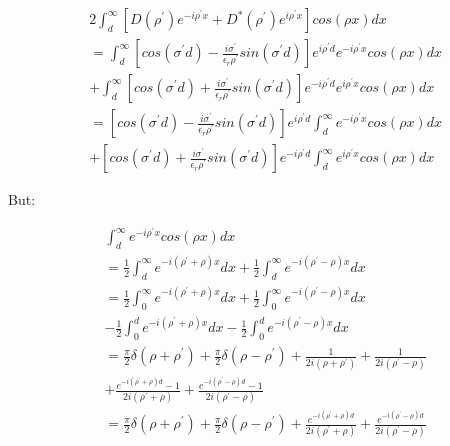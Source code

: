 \documentclass[11pt, oneside]{article}   	%
\begin{document}
\begin{align*}
 & 2\int_{d}^{\infty}\left[D\left(\rho^{\prime}\right)e^{-i\rho^{\prime}x}+D^{*}\left(\rho^{\prime}\right)e^{i\rho^{\prime}x}\right]cos\left(\rho x\right)dx\\
 & =\int_{d}^{\infty}\left[cos\left(\sigma^{\prime}d\right)-\frac{i\sigma^{\prime}}{\epsilon_{r}\rho^{\prime}}sin\left(\sigma^{\prime}d\right)\right]e^{i\rho^{\prime}d}e^{-i\rho^{\prime}x}cos\left(\rho x\right)dx\\
 & +\int_{d}^{\infty}\left[cos\left(\sigma^{\prime}d\right)+\frac{i\sigma^{\prime}}{\epsilon_{r}\rho^{\prime}}sin\left(\sigma^{\prime}d\right)\right]e^{-i\rho^{\prime}d}e^{i\rho^{\prime}x}cos\left(\rho x\right)dx\\
 & =\left[cos\left(\sigma^{\prime}d\right)-\frac{i\sigma^{\prime}}{\epsilon_{r}\rho^{\prime}}sin\left(\sigma^{\prime}d\right)\right]e^{i\rho^{\prime}d}\int_{d}^{\infty}e^{-i\rho^{\prime}x}cos\left(\rho x\right)dx\\
 & +\left[cos\left(\sigma^{\prime}d\right)+\frac{i\sigma^{\prime}}{\epsilon_{r}\rho^{\prime}}sin\left(\sigma^{\prime}d\right)\right]e^{-i\rho^{\prime}d}\int_{d}^{\infty}e^{i\rho^{\prime}x}cos\left(\rho x\right)dx
\end{align*}


But: 

\begin{align*}
 & \int_{d}^{\infty}e^{-i\rho^{\prime}x}cos\left(\rho x\right)dx\\
 & =\frac{1}{2}\int_{d}^{\infty}e^{-i\left(\rho^{\prime}+\rho\right)x}dx+\frac{1}{2}\int_{d}^{\infty}e^{-i\left(\rho^{\prime}-\rho\right)x}dx\\
 & =\frac{1}{2}\int_{0}^{\infty}e^{-i\left(\rho^{\prime}+\rho\right)x}dx+\frac{1}{2}\int_{0}^{\infty}e^{-i\left(\rho^{\prime}-\rho\right)x}dx\\
 & -\frac{1}{2}\int_{0}^{d}e^{-i\left(\rho^{\prime}+\rho\right)x}dx-\frac{1}{2}\int_{0}^{d}e^{-i\left(\rho^{\prime}-\rho\right)x}dx\\
 & =\frac{\pi}{2}\delta\left(\rho+\rho^{\prime}\right)+\frac{\pi}{2}\delta\left(\rho-\rho^{\prime}\right)+\frac{1}{2i\left(\rho+\rho^{\prime}\right)}+\frac{1}{2i\left(\rho^{\prime}-\rho\right)}\\
 & +\frac{e^{-i\left(\rho^{\prime}+\rho\right)d}-1}{2i\left(\rho^{\prime}+\rho\right)}+\frac{e^{-i\left(\rho^{\prime}-\rho\right)d}-1}{2i\left(\rho^{\prime}-\rho\right)}\\
 & =\frac{\pi}{2}\delta\left(\rho+\rho^{\prime}\right)+\frac{\pi}{2}\delta\left(\rho-\rho^{\prime}\right)+\frac{e^{-i\left(\rho^{\prime}+\rho\right)d}}{2i\left(\rho^{\prime}+\rho\right)}+\frac{e^{-i\left(\rho^{\prime}-\rho\right)d}}{2i\left(\rho^{\prime}-\rho\right)}
\end{align*}
\end{document}
